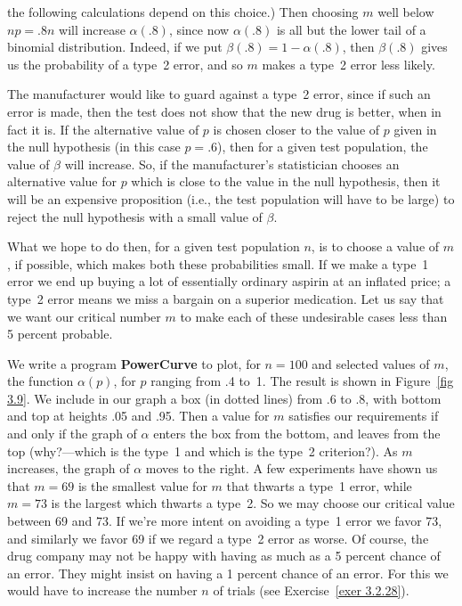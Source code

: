 \begin{example}
the following calculations depend on this choice.)  Then choosing $m$ well below $np =
.8n$ will increase $\alpha(.8)$, since now
$\alpha(.8)$ is all but the lower tail of a binomial distribution.  Indeed, if we put
$\beta(.8) = 1 - \alpha(.8)$, then $\beta(.8)$ gives us the probability of a  type~2
error, and so  $m$ makes a type~2 error less likely.  
\par The manufacturer would like to guard against a type~2 error, since if such an
error is made, then the test does not show that the new drug is better, when in fact
it is.  If the alternative value of $p$ is chosen closer to the value of $p$ given in
the null hypothesis (in this case $p =.6$), then for a given test population, the
value of $\beta$ will increase.
 So, if the manufacturer's statistician chooses an alternative value for $p$ which is
close to the value in the null hypothesis, then it will be an expensive proposition
(i.e., the test population will have to be large) to reject the null hypothesis with a
small value of $\beta$.
\par What we hope to do then, for a given test population $n$, is to choose a value of
$m$, if possible, which makes both these probabilities small.  If we make a type~1
error we end up buying a lot of essentially ordinary aspirin at an inflated price; a
type~2 error means we miss a bargain on a superior medication.  Let us say that we
want our critical number $m$ to make each of these undesirable cases less than 5
percent probable.
\par We write a program {\bf PowerCurve} to plot, for $n = 100$ and
selected values of
$m$, the function $\alpha(p)$, for $p$ ranging from .4 to~1.  The result is shown in
Figure~\ref{fig 3.9}.  We include in our graph a box (in dotted lines) from .6 to .8,
with bottom and top at heights .05 and .95.  Then a value for $m$ satisfies our
requirements if and only if the graph of $\alpha$ enters the box from the bottom, and
leaves from the top (why?---which is the type~1 and which is the type~2 criterion?). 
As $m$ increases, the graph of $\alpha$ moves to the right.  A few experiments have
shown us that $m = 69$ is the smallest value for
$m$ that thwarts a type~1 error, while $m = 73$ is the largest which thwarts a
type~2.  So we may choose our critical value between 69 and 73.  If we're more intent
on avoiding a type~1 error we favor 73, and similarly we favor 69 if we regard a
type~2 error as worse.  Of course, the drug company may not be happy with having as
much as a 5 percent chance of an error.  They might insist on having a 1 percent
chance of an error.  For this we would have to increase the number $n$ of trials (see
Exercise~\ref{exer 3.2.28}).
\end{example}

